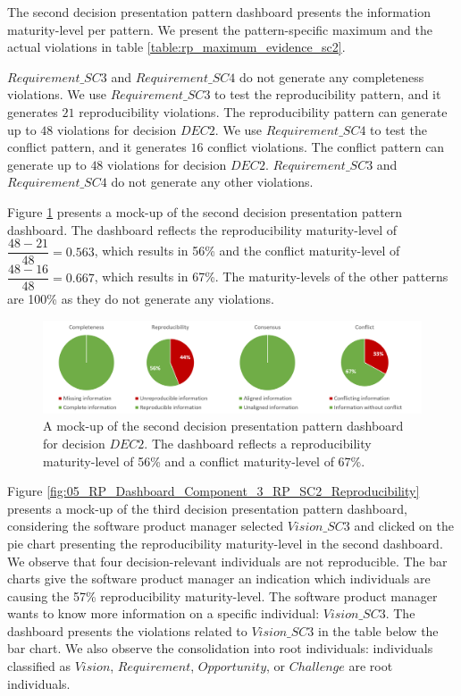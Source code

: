 The second decision presentation pattern dashboard presents the information maturity-level per pattern. We present the pattern-specific maximum and the actual violations in table \ref{table:rp_maximum_evidence_sc2}.

$Requirement\_SC3$ and $Requirement\_SC4$ do not generate any completeness violations. We use $Requirement\_SC3$ to test the reproducibility pattern, and it generates $21$ reproducibility violations. The reproducibility pattern can generate up to $48$ violations for decision $DEC2$. We use $Requirement\_SC4$ to test the conflict pattern, and it generates $16$ conflict violations. The conflict pattern can generate up to $48$ violations for decision $DEC2$. $Requirement\_SC3$ and $Requirement\_SC4$ do not generate any other violations. 

Figure \ref{fig:05_RP_Dashboard_Component_2_RP_SC2} presents a mock-up of the second decision presentation pattern dashboard. The dashboard reflects the reproducibility maturity-level of $\dfrac{48-21}{48} = 0.563$, which results in 56\% and the conflict maturity-level of $\dfrac{48-16}{48} = 0.667$, which results in 67\%. The maturity-levels of the other patterns are 100\% as they do not generate any violations.

\begin{figure}[H]
\centering
  \includegraphics[width=17cm]{../../Images/05_Validation/05_RP_Dashboard_Component_2_RP_SC2.png}
  \caption{A mock-up of the second decision presentation pattern dashboard for decision $DEC2$. The dashboard reflects a reproducibility maturity-level of 56\% and a conflict maturity-level of 67\%.}
  \label{fig:05_RP_Dashboard_Component_2_RP_SC2}
\end{figure}

Figure \ref{fig:05_RP_Dashboard_Component_3_RP_SC2_Reproducibility} presents a mock-up of the third decision presentation pattern dashboard, considering the software product manager selected $Vision\_SC3$ and clicked on the pie chart presenting the reproducibility maturity-level in the second dashboard. We observe that four decision-relevant individuals are not reproducible. The bar charts give the software product manager an indication which individuals are causing the 57\% reproducibility maturity-level. The software product manager wants to know more information on a specific individual: $Vision\_SC3$. The dashboard presents the violations related to $Vision\_SC3$ in the table below the bar chart. We also observe the consolidation into root individuals: individuals classified as $Vision$, $Requirement$, $Opportunity$, or $Challenge$ are root individuals. 

